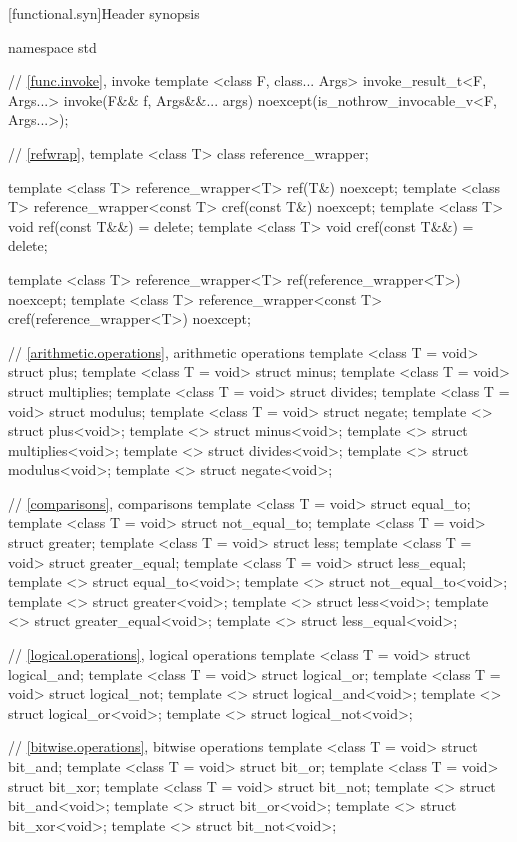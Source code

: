 [functional.syn]{Header  synopsis}

%
%
\begin{codeblock}
namespace std {
  // \ref{func.invoke}, invoke
  template <class F, class... Args>
    invoke_result_t<F, Args...> invoke(F&& f, Args&&... args)
      noexcept(is_nothrow_invocable_v<F, Args...>);

  // \ref{refwrap}, 
  template <class T> class reference_wrapper;

  template <class T> reference_wrapper<T> ref(T&) noexcept;
  template <class T> reference_wrapper<const T> cref(const T&) noexcept;
  template <class T> void ref(const T&&) = delete;
  template <class T> void cref(const T&&) = delete;

  template <class T> reference_wrapper<T> ref(reference_wrapper<T>) noexcept;
  template <class T> reference_wrapper<const T> cref(reference_wrapper<T>) noexcept;

  // \ref{arithmetic.operations}, arithmetic operations
  template <class T = void> struct plus;
  template <class T = void> struct minus;
  template <class T = void> struct multiplies;
  template <class T = void> struct divides;
  template <class T = void> struct modulus;
  template <class T = void> struct negate;
  template <> struct plus<void>;
  template <> struct minus<void>;
  template <> struct multiplies<void>;
  template <> struct divides<void>;
  template <> struct modulus<void>;
  template <> struct negate<void>;

  // \ref{comparisons}, comparisons
  template <class T = void> struct equal_to;
  template <class T = void> struct not_equal_to;
  template <class T = void> struct greater;
  template <class T = void> struct less;
  template <class T = void> struct greater_equal;
  template <class T = void> struct less_equal;
  template <> struct equal_to<void>;
  template <> struct not_equal_to<void>;
  template <> struct greater<void>;
  template <> struct less<void>;
  template <> struct greater_equal<void>;
  template <> struct less_equal<void>;

  // \ref{logical.operations}, logical operations
  template <class T = void> struct logical_and;
  template <class T = void> struct logical_or;
  template <class T = void> struct logical_not;
  template <> struct logical_and<void>;
  template <> struct logical_or<void>;
  template <> struct logical_not<void>;

  // \ref{bitwise.operations}, bitwise operations
  template <class T = void> struct bit_and;
  template <class T = void> struct bit_or;
  template <class T = void> struct bit_xor;
  template <class T = void> struct bit_not;
  template <> struct bit_and<void>;
  template <> struct bit_or<void>;
  template <> struct bit_xor<void>;
  template <> struct bit_not<void>;

}
\end{codeblock}
